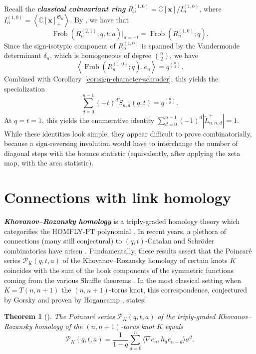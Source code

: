 \documentclass[11pt, noadjust, reqno]{amsart}
\newtheorem{theorem}{Theorem}[section]
\theoremstyle{definition}
\theoremstyle{remark}
\numberwithin{equation}{section}
\newcommand{\0}{\emptyset}
\newcommand{\C}{\mathbb{C}}
\DeclareMathOperator{\Frob}{Frob}
\newcommand{\newword}[1]{\emph{\textbf{#1}}}
\begin{document}
Recall the \newword{classical coinvariant ring} $R_n^{(1,0)} = \C[\bm{x}]/I_n^{(1,0)}$, where $I_n^{(1,0)} = \left\langle \C[\bm{x}]^{\mathfrak{S}_n}_+ \right\rangle$. 
By \cite{Lentfer-Supersymmetry}, we have that
\begin{equation*}
    \Frob(R_n^{(2,1)};q,t;a)|_{a=-t} = \Frob(R_n^{(1,0)};q).
\end{equation*}
Since the sign-isotypic component of $R_n^{(1,0)}$ is spanned by the Vandermonde determinant $\delta_n$, which is homogeneous of degree $\binom{n}{2}$, we have
\begin{equation*}
    \left\langle \Frob(R_n^{(1,0)};q), e_n \right\rangle = q^{\binom{n}{2}}.
\end{equation*}
Combined with Corollary~\ref{cor:sign-character-schroder}, this yields the specialization
\begin{equation*}\label{eq:a-equals-minus-t}
    \sum_{d=0}^{n-1} (-t)^d \widetilde{S}_{n,d}(q,t) = q^{\binom{n}{2}}.
\end{equation*}
At $q=t=1$, this yields the enumerative identity
$\sum_{d=0}^{n-1}(-1)^d |\tilde{L}_{n,n,d}^+| = 1$.    
While these identities look simple, they appear difficult to prove combinatorially, because a sign-reversing involution would have to interchange the number of diagonal steps with the bounce statistic (equivalently, after applying the zeta map, with the area statistic).


\section{Connections with link homology}\label{sec:link-homology}
\newword{Khovanov--Rozansky homology} is a triply-graded homology theory which categorifies the HOMFLY-PT polynomial \cite{KR1,KR2,Kh}. In recent years, a plethora of connections (many still conjectural) to $(q,t)$-Catalan and Schr\"oder combinatorics have arisen \cite{Gorsky-Catalan,Hog17, GL1, GL2,GM1,GM2,GMV1,GMV2,Mellit,CGHM}. 
Fundamentally, these results assert that the Poincar\'e series $\mathcal{P}_K(q,t,a)$ of the Khovanov--Rozansky homology of certain knots $K$ coincides with the sum of the hook components of the symmetric functions coming from the various Shuffle theorems \cite{CarlssonMellit2018, Mellit, BHMPS-Paths}. 
In the most classical setting when $K = T(n,n+1)$ the $(n,n+1)$-torus knot, this correspondence, conjectured by Gorsky \cite{Gorsky-Catalan} and proven by Hogancamp \cite{Hog17}, states:

\begin{theorem}[\cite{Hog17}]\label{thm:Hog-torus}
The Poincar\'e series $\mathcal{P}_K(q,t,a)$ of the triply-graded Khovanov--Rozansky homology of the $(n, n+ 1)$-torus knot $K$ equals
\begin{equation} \label{eq:torus homology}  \mathcal{P}_K(q,t,a)=\frac{1}{1-q}\sum_{d=0}^n \Big\langle \nabla e_n, h_de_{n-d} \Big\rangle a^d.
\end{equation}
\end{theorem}
\end{document}
